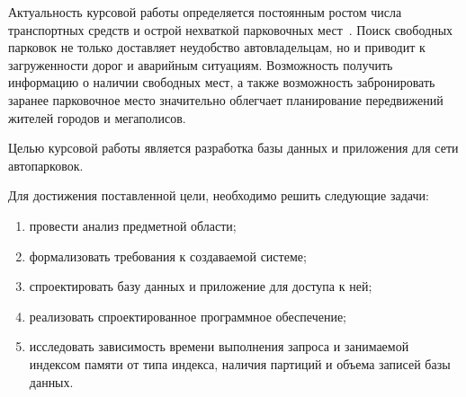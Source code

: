 
Актуальность курсовой работы определяется постоянным ростом числа транспортных средств и острой нехваткой парковочных мест~\cite{actual_parking}.
Поиск свободных парковок не только доставляет неудобство автовладельцам, но и приводит к загруженности дорог и аварийным ситуациям.
Возможность получить информацию о наличии свободных мест, а также возможность забронировать заранее парковочное место значительно облегчает планирование передвижений жителей городов и мегаполисов.

Целью курсовой работы является разработка базы данных и приложения для сети автопарковок.

Для достижения поставленной цели, необходимо решить следующие задачи:
\begin{enumerate}
	\item провести анализ предметной области;
	\item формализовать требования к создаваемой системе;
	\item спроектировать базу данных и приложение для доступа к ней;
	\item реализовать спроектированное программное обеспечение;
	\item исследовать зависимость времени выполнения запроса и занимаемой индексом памяти от типа индекса, наличия партиций и объема записей базы данных.
\end{enumerate}

